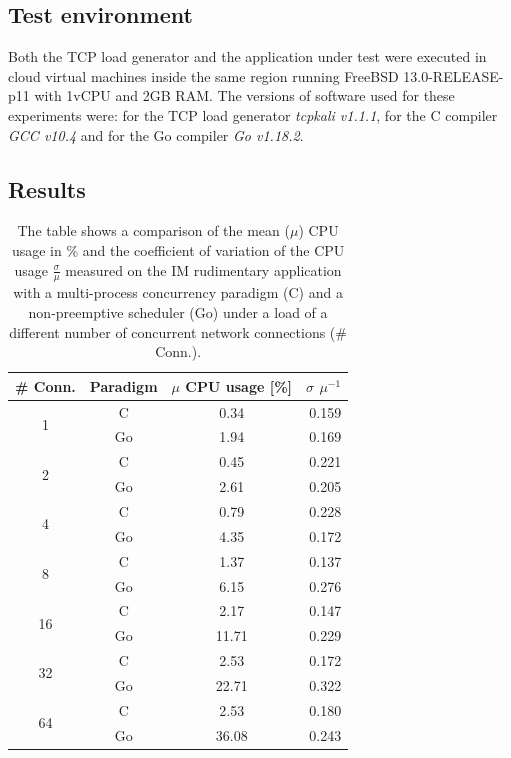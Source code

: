 \subsection{Test environment}
Both the TCP load generator and the application under test were executed in cloud virtual machines inside the same region running FreeBSD 13.0-RELEASE-p11 with 1vCPU and 2GB RAM. The versions of software used for these experiments were: for the TCP load generator \textit{tcpkali v1.1.1}, for the C compiler \textit{GCC v10.4} and for the Go compiler \textit{Go v1.18.2}.

\subsection{Results}
\begin{table}[h]
	\centering
\begin{tabular}{|c|ccr|}
		\hline
	\# Conn.         &  Paradigm    & $\mu$ CPU usage [\%] & $\sigma$ $\mu^{-1}$ \\
	\hline
	\multirow{2}{*}{1} & C & 0.34 & 0.159   \\
	&\cellcolor[gray]{0.9} Go &\cellcolor[gray]{0.9} 1.94 &\cellcolor[gray]{0.9} 0.169  \\ \hline
	\multirow{2}{*}{2} & C & 0.45 & 0.221   \\
	&\cellcolor[gray]{0.9} Go &\cellcolor[gray]{0.9} 2.61 &\cellcolor[gray]{0.9} 0.205  \\ \hline
	\multirow{2}{*}{4} & C & 0.79 & 0.228   \\
&\cellcolor[gray]{0.9} Go &\cellcolor[gray]{0.9} 4.35 &\cellcolor[gray]{0.9} 0.172  \\ \hline
	\multirow{2}{*}{8} & C & 1.37 & 0.137   \\
&\cellcolor[gray]{0.9} Go &\cellcolor[gray]{0.9} 6.15 &\cellcolor[gray]{0.9} 0.276  \\ \hline
	\multirow{2}{*}{16} & C & 2.17 & 0.147   \\
&\cellcolor[gray]{0.9} Go &\cellcolor[gray]{0.9} 11.71 &\cellcolor[gray]{0.9} 0.229  \\ \hline
	\multirow{2}{*}{32} & C & 2.53 & 0.172   \\
&\cellcolor[gray]{0.9} Go &\cellcolor[gray]{0.9} 22.71 &\cellcolor[gray]{0.9} 0.322  \\ \hline
	\multirow{2}{*}{64} & C & 2.53 & 0.180   \\
&\cellcolor[gray]{0.9} Go &\cellcolor[gray]{0.9} 36.08 &\cellcolor[gray]{0.9} 0.243  \\ \hline
\end{tabular}
\bigskip	
\caption{The table shows a comparison of the mean ($\mu$) CPU usage in \% and the coefficient of variation of the CPU usage $\frac{\sigma}{\mu}$ measured on the IM rudimentary application with a multi-process concurrency paradigm (C) and a non-preemptive scheduler (Go) under a load of a different number of concurrent network connections (\# Conn.).}
\label{tab_results}
\end{table}

